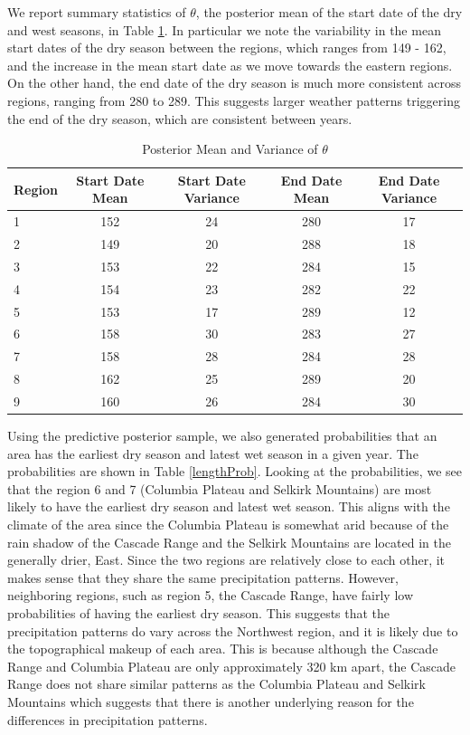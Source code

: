 \documentclass{article}
\begin{document}
We report summary statistics of $\theta$, the posterior mean of the start date of the dry and west seasons, in Table \ref{tab:meanparams}.  In particular we note the variability in the mean start dates of the dry season between the regions, which ranges from 149 - 162, and the increase in the mean start date as we move towards the eastern regions. On the other hand, the end date of the dry season is much more consistent across regions, ranging from 280 to 289. This suggests larger weather patterns triggering the end of the dry season, which are consistent between years. %

\begin{table}[h!]
\begin{tabular}{|l|c|c|c|c|}
\hline
Region & Start Date Mean & Start Date Variance & End Date Mean & End Date Variance\\
\hline
\hline
1&152&24&280&17\\
2&149&20&288&18\\
3&153&22&284&15\\
4&154&23&282&22\\
5&153&17&289&12\\
6&158&30&283&27\\
7&158&28&284&28\\
8&162&25&289&20\\
9&160&26&284&30\\
\hline
\end{tabular}
\caption{Posterior Mean and Variance of $\theta$}
\label{tab:meanparams}
\end{table}

Using the predictive posterior sample, we also generated probabilities that an area has the earliest dry season and latest wet season in a given year. The probabilities are shown in Table \ref{lengthProb}. Looking at the probabilities, we see that the region 6 and 7 (Columbia Plateau and Selkirk Mountains) are most likely to have the earliest dry season and latest wet season. This aligns with the climate of the area since the Columbia Plateau is somewhat arid because of the rain shadow of the Cascade Range and the Selkirk Mountains are located in the generally drier, East. Since the two regions are relatively close to each other, it makes sense that they share the same precipitation patterns. However, neighboring regions, such as region 5, the Cascade Range, have fairly low probabilities of having the earliest dry season. This suggests that the precipitation patterns do vary across the Northwest region, and it is likely due to the topographical makeup of each area. This is because although the Cascade Range and Columbia Plateau are only approximately 320 km apart, the Cascade Range does not share similar patterns as the Columbia Plateau and Selkirk Mountains which suggests that there is another underlying reason for the differences in precipitation patterns. 
\end{document}
